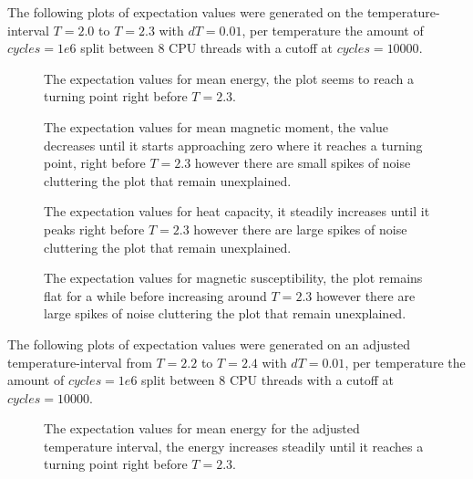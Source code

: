 \documentclass{emulateapj}
\begin{document}
The following plots of expectation values were generated on the temperature-interval $T=2.0$ to $T=2.3$ with $dT=0.01$, per temperature the amount of $cycles=1e6$ split between 8 CPU threads with a cutoff at $cycles=10000$.
%
\begin{figure}[H]

\mbox{}

\caption{The expectation values for mean energy, the plot seems to reach a turning point right before $T=2.3$.}
\label{fig:Emean}
\end{figure}
%
%
\begin{figure}[H]

\mbox{}

\caption{The expectation values for mean magnetic moment, the value decreases until it starts approaching zero where it reaches a turning point, right before $T=2.3$ however there are small spikes of noise cluttering the plot that remain unexplained.}
\label{fig:Mmean}
\end{figure}
%
%
\begin{figure}[H]

\mbox{}

\caption{The expectation values for heat capacity, it steadily increases until it peaks right before $T=2.3$ however there are large spikes of noise cluttering the plot that remain unexplained.}
\label{fig:HCMean}
\end{figure}
%
%
\begin{figure}[H]

\mbox{}

\caption{The expectation values for magnetic susceptibility, the plot remains flat for a while before increasing around $T=2.3$ however there are large spikes of noise cluttering the plot that remain unexplained.}
\label{fig:SMean}
\end{figure}
%
The following plots of expectation values were generated on an adjusted temperature-interval from $T=2.2$ to $T=2.4$ with $dT=0.01$, per temperature the amount of $cycles=1e6$ split between 8 CPU threads with a cutoff at $cycles=10000$.
%
\begin{figure}[H]

\mbox{}

\caption{The expectation values for mean energy for the adjusted temperature interval, the energy increases steadily until it reaches a turning point right before $T=2.3$.}
\label{fig:Emean2}
\end{figure}
\end{document}
